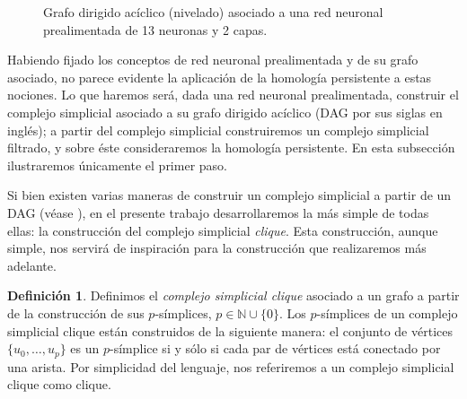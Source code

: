 \documentclass[12pt, a4paper, twoside]{book}
\numberwithin{equation}{section}
\theoremstyle{definition}
\newtheorem{defi}{Definición}[section]
\newenvironment{ejem}
  {\pushQED{\qed}\renewcommand{\qedsymbol}{$\blacktriangleleft$}\ejemplo}
  {\popQED\endejemplo}
\theoremstyle{remark}
\theoremstyle{plain}
\begin{document}
\begin{ejem}
\begin{figure}[H]
			\caption{Grafo dirigido acíclico (nivelado) asociado a 
			una red neuronal prealimentada de 13 neuronas y 2 capas.}
			\label{fig:redEjem}
		\end{figure}
	\end{ejem}

	Habiendo fijado los conceptos de red neuronal prealimentada y de su 
	grafo asociado, no parece evidente la aplicación de la homología 
	persistente a estas nociones. Lo que haremos será, dada una red 
	neuronal prealimentada, construir el complejo simplicial asociado a su
	grafo dirigido acíclico (DAG por sus siglas en inglés); a partir del 
	complejo simplicial construiremos un complejo simplicial filtrado, y 
	sobre éste consideraremos la homología persistente. En esta subsección
	ilustraremos únicamente el primer paso.

	Si bien existen varias maneras de construir un complejo simplicial a 
	partir de un DAG (véase \cite{Clique-Jakob}), en el presente trabajo desarrollaremos la más simple
	de todas ellas: la construcción del complejo simplicial \emph{clique}. 
	Esta construcción, aunque simple, nos servirá de inspiración para la 
	construcción que realizaremos más adelante. 
	
	\begin{defi}
		Definimos el \textit{complejo simplicial clique} asociado a un
		grafo a partir de la construcción de sus $p$-símplices, $p \in 
		\mathbb{N}\cup\{0\}$. Los $p$-símplices de un complejo 
		simplicial clique están construidos de la siguiente manera: el 
		conjunto de vértices $\{u_{0},\dots,u_{p}\}$ es un 
		$p$-símplice si y sólo si cada par de vértices está conectado 
		por una arista. Por simplicidad del lenguaje, nos referiremos
		a un complejo simplicial clique como clique.
	\end{defi}
\end{document}
